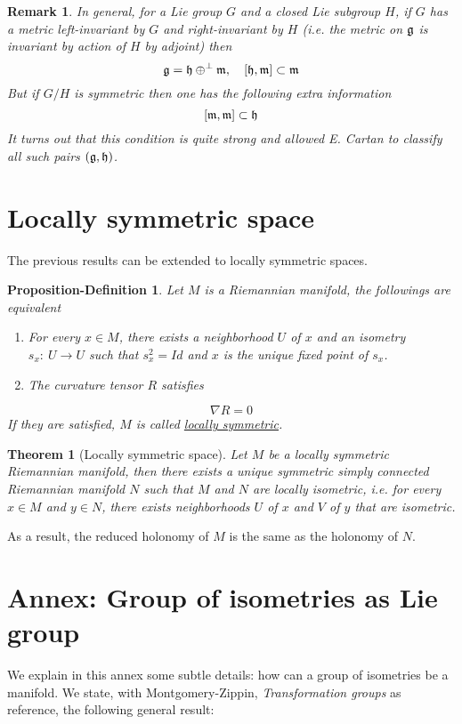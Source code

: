 \documentclass[11pt]{article}
\newtheorem{remark}{Remark}
\newtheorem{theorem}{Theorem}
\newtheorem{propdef}[definition]{Proposition-Definition}
\begin{document}
\begin{remark}
In general, for a Lie group \(G\) and a closed Lie subgroup \(H\), if \(G\) has a metric left-invariant by
\(G\) and right-invariant by \(H\) (i.e. the metric on \(\frak{g}\) is invariant by action of \(H\) by
adjoint) then 
\[ 
\frak{g} = \frak{h} \oplus^\perp \frak{m},\quad [\frak{h},\frak{m}]\subset \frak{m}
\] 
But if \(G/H\) is symmetric then one has the following extra information 
\[
[\frak{m},\frak{m}]\subset \frak{h} 
\] 
It turns out that this condition is quite strong and allowed E. Cartan to
classify all such pairs \((\frak{g},\frak{h})\).
\end{remark}

\section{Locally symmetric space}
\label{sec:orgf771c74}
The previous results can be extended to locally symmetric spaces.

\begin{propdef}
Let \(M\) is a Riemannian manifold, the followings are equivalent
\begin{enumerate}
\item For every \(x\in M\), there exists a neighborhood \(U\) of \(x\) and an isometry \(s_x:\
   U\longrightarrow U\) such that \(s_x^2=Id\) and \(x\) is the unique fixed point of \(s_x\).
\item The curvature tensor \(R\) satisfies
\end{enumerate}
\[
\nabla R = 0
\]
If they are satisfied, \(M\) is called  \uline{locally symmetric}.
\end{propdef}

\begin{theorem}[Locally symmetric space]
\label{orgac5c79e}
Let \(M\) be a locally symmetric Riemannian manifold, then there exists a unique symmetric simply
connected Riemannian manifold \(N\) such that \(M\) and \(N\) are locally isometric, i.e. for every
\(x\in M\) and \(y\in N\), there exists neighborhoods \(U\) of \(x\) and \(V\) of \(y\) that are isometric.
\end{theorem}

As a result, the reduced holonomy of \(M\) is the same as the holonomy of \(N\).

\section{Annex: Group of isometries as Lie group}
\label{sec:org58fb4bf}
We explain in this annex some subtle details: how can a group of isometries be a manifold. We state, with
Montgomery-Zippin, \emph{Transformation groups} as reference, the following general result:
\end{document}
